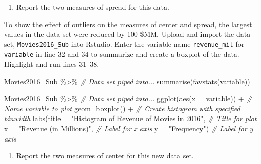 \documentclass[
]{report}
\newenvironment{Shaded}{\begin{snugshade}}{\end{snugshade}}
\newcommand{\AttributeTok}[1]{\textcolor[rgb]{0.77,0.63,0.00}{#1}}
\newcommand{\CommentTok}[1]{\textcolor[rgb]{0.56,0.35,0.01}{\textit{#1}}}
\newcommand{\FunctionTok}[1]{\textcolor[rgb]{0.00,0.00,0.00}{#1}}
\newcommand{\NormalTok}[1]{#1}
\newcommand{\SpecialCharTok}[1]{\textcolor[rgb]{0.00,0.00,0.00}{#1}}
\newcommand{\StringTok}[1]{\textcolor[rgb]{0.31,0.60,0.02}{#1}}
\providecommand{\tightlist}{%
  \setlength{\itemsep}{0pt}\setlength{\parskip}{0pt}}
\begin{document}
\begin{enumerate}
\def\labelenumi{\arabic{enumi}.}
\setcounter{enumi}{8}
\tightlist
\item
  Report the two measures of spread for this data.
\end{enumerate}

\vspace{0.8in}

To show the effect of outliers on the measures of center and spread, the largest values in the data set were reduced by 100 \$MM. Upload and import the data set, \texttt{Movies2016\_Sub} into Rstudio. Enter the variable name \texttt{revenue\_mil} for \texttt{variable} in line 32 and 34 to summarize and create a boxplot of the data. Highlight and run lines 31--38.

\begin{Shaded}
\begin{Highlighting}[]
\NormalTok{Movies2016\_Sub }\SpecialCharTok{\%\textgreater{}\%} \CommentTok{\# Data set piped into...}
  \FunctionTok{summarise}\NormalTok{(}\FunctionTok{favstats}\NormalTok{(variable))}
\end{Highlighting}
\end{Shaded}

\begin{Shaded}
\begin{Highlighting}[]
\NormalTok{Movies2016\_Sub }\SpecialCharTok{\%\textgreater{}\%} \CommentTok{\# Data set piped into...}
\FunctionTok{ggplot}\NormalTok{(}\FunctionTok{aes}\NormalTok{(}\AttributeTok{x =}\NormalTok{ variable)) }\SpecialCharTok{+}   \CommentTok{\# Name variable to plot}
  \FunctionTok{geom\_boxplot}\NormalTok{() }\SpecialCharTok{+}  \CommentTok{\# Create histogram with specified binwidth}
  \FunctionTok{labs}\NormalTok{(}\AttributeTok{title =} \StringTok{"Histogram of Revenue of Movies in 2016"}\NormalTok{, }\CommentTok{\# Title for plot}
       \AttributeTok{x =} \StringTok{"Revenue (in Millions)"}\NormalTok{, }\CommentTok{\# Label for x axis}
       \AttributeTok{y =} \StringTok{"Frequency"}\NormalTok{) }\CommentTok{\# Label for y axis}
\end{Highlighting}
\end{Shaded}

\begin{enumerate}
\def\labelenumi{\arabic{enumi}.}
\setcounter{enumi}{9}
\tightlist
\item
  Report the two measures of center for this new data set.
\end{enumerate}
\end{document}
